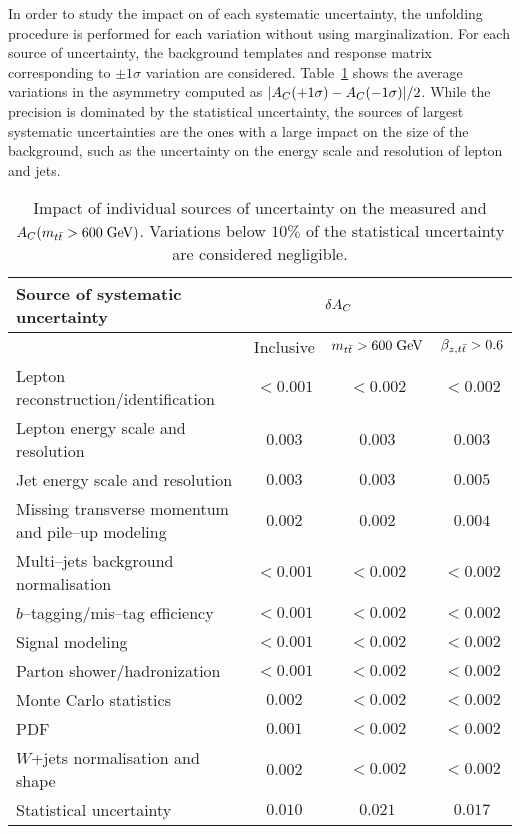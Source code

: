 In order to study the impact on \ac{} of each systematic uncertainty,
the unfolding procedure is performed for each variation without using
marginalization. 
For each source of uncertainty, the background templates and
response matrix corresponding to $\pm1\sigma$ variation are
considered. 
Table~\ref{tab:systematics} shows the average variations in the
asymmetry computed as $|A_C{}(+1\sigma)-A_C{}(-1\sigma)|/2$.
While the precision is dominated by the statistical uncertainty, the
sources of largest systematic uncertainties are the ones with a large
impact on the size of the \wjets{} background, such as the
uncertainty on the energy scale and resolution of lepton and jets. 

\begin{table}[!htb]\centering
\begin{tabular}{l c c c}
\toprule
Source of systematic uncertainty  & \multicolumn{2}{c}{$\delta{\ensuremath{A_C}{}}$} \\
\midrule
  & Inclusive & $m_{t\bar{t}}{} >600\; \mathrm{GeV}{}$ & $\beta_{z,t\bar{t}}{}>0.6$ \\
\midrule
Lepton reconstruction/identification    & $<0.001$ & $<0.002$ & $<0.002$\\
Lepton energy scale and resolution      & $0.003$    & $0.003$   &  $0.003$\\
Jet energy scale and resolution             & $0.003$    & $0.003$   &
$0.005$ \\
Missing transverse momentum and pile--up modeling & $0.002$ & $0.002$
& $0.004$\\
Multi--jets background normalisation    & $<0.001$ & $<0.002$ & $<0.002$\\
$b$--tagging/mis--tag efficiency         & $<0.001$  & $<0.002$ & $<0.002$\\
Signal modeling                                       & $<0.001$ &
$<0.002$ & $<0.002$\\
Parton shower/hadronization             & $<0.001$  & $<0.002$ & $<0.002$\\
Monte Carlo statistics                         & $0.002$  & $<0.002$ & $<0.002$\\
PDF                                                      & $0.001$  & $<0.002$  & $<0.002$\\
$W$+jets normalisation and shape     & $0.002$  & $<0.002$ & $<0.002$\\
\midrule
Statistical uncertainty                          & $0.010$ & $0.021$ & $0.017$\\
\bottomrule
\end{tabular}
\caption{Impact of individual sources of uncertainty on the measured
  \ac{} and $A_C{}(m_{t\bar{t}}{}>600 \; \mathrm{GeV}{})$. Variations below $10\%$ of the
  statistical uncertainty are considered negligible.}
\label{tab:systematics}
\end{table}

